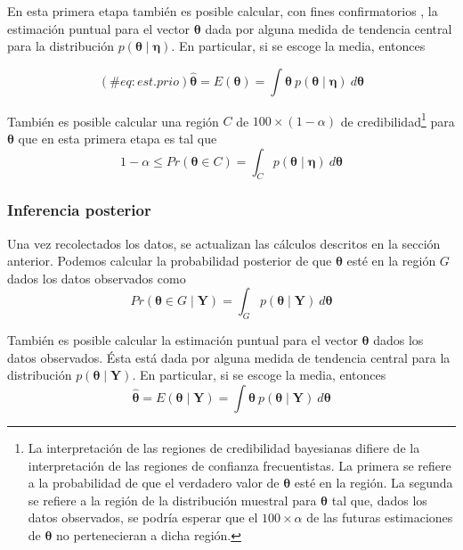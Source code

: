 \documentclass[
  10pt,
  spanish,
]{book}
\theoremstyle{definition}
\theoremstyle{definition}
\theoremstyle{definition}
\theoremstyle{definition}
\theoremstyle{remark}
\begin{document}
En esta primera etapa también es posible calcular, con fines
confirmatorios \citep{Carlin96}, la estimación puntual para el vector
\(\boldsymbol \theta\) dada por alguna medida de tendencia central para la
distribución \(p(\boldsymbol \theta\mid \boldsymbol \eta)\). En particular, si se escoge la
media, entonces

\begin{equation}
(\#eq:est.prio)
\hat{\boldsymbol \theta}=E(\boldsymbol \theta)=\int \boldsymbol \theta\ p(\boldsymbol \theta\mid \boldsymbol \eta)\ d\boldsymbol \theta
\end{equation}

También es posible calcular una región \(C\) de \(100\times(1-\alpha)%
\) de
credibilidad\footnote{La interpretación de las regiones de credibilidad
  bayesianas difiere de la interpretación de las regiones de confianza
  frecuentistas. La primera se refiere a la probabilidad de que el
  verdadero valor de \(\boldsymbol \theta\) esté en la región. La segunda se refiere a
  la región de la distribución muestral para \(\boldsymbol \theta\) tal que, dados los
  datos observados, se podría esperar que el \(100\times\alpha%
  \) de las
  futuras estimaciones de \(\boldsymbol \theta\) no pertenecieran a dicha región.} para
\(\boldsymbol \theta\) que en esta primera etapa es tal que \begin{equation}
1-\alpha \leq Pr(\boldsymbol \theta\in C)=\int_Cp(\boldsymbol \theta\mid \boldsymbol \eta)\ d\boldsymbol \theta
\end{equation}

\hypertarget{inferencia-posterior}{%
\subsubsection*{Inferencia posterior}\label{inferencia-posterior}}

Una vez recolectados los datos, se actualizan las cálculos descritos en
la sección anterior. Podemos calcular la probabilidad posterior
de que \(\boldsymbol \theta\) esté en la región \(G\) dados los datos observados como
\begin{equation}
Pr(\boldsymbol \theta\in G  \mid \mathbf{Y})=\int_G p(\boldsymbol \theta\mid \mathbf{Y})\ d\boldsymbol \theta
\end{equation}

También es posible calcular la estimación puntual para el vector
\(\boldsymbol \theta\) dados los datos observados. Ésta está dada por alguna medida
de tendencia central para la distribución \(p(\boldsymbol \theta\mid \mathbf{Y})\).
En particular, si se escoge la media, entonces \begin{equation}
\hat{\boldsymbol \theta}=E(\boldsymbol \theta\mid \mathbf{Y})=\int \boldsymbol \theta\ p(\boldsymbol \theta\mid \mathbf{Y})\ d\boldsymbol \theta
\end{equation}
\end{document}
